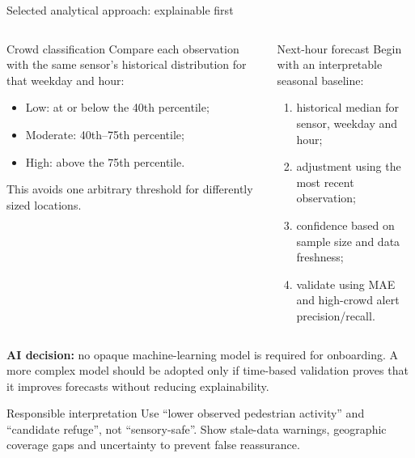 \documentclass[aspectratio=169,11pt]{beamer}
\begin{document}
\begin{frame}{Selected analytical approach: explainable first}
  \small
  \begin{columns}[T,onlytextwidth]
      \begin{block}{Crowd classification}
        Compare each observation with the same sensor's historical distribution
        for that weekday and hour:
        \begin{itemize}
          \item Low: at or below the 40th percentile;
          \item Moderate: 40th--75th percentile;
          \item High: above the 75th percentile.
        \end{itemize}
        This avoids one arbitrary threshold for differently sized locations.
      \end{block}

      \begin{block}{Next-hour forecast}
        Begin with an interpretable seasonal baseline:
        \begin{enumerate}
          \item historical median for sensor, weekday and hour;
          \item adjustment using the most recent observation;
          \item confidence based on sample size and data freshness;
          \item validate using MAE and high-crowd alert precision/recall.
        \end{enumerate}
      \end{block}
  \end{columns}

  \vspace{0.3em}
  \textbf{AI decision:} no opaque machine-learning model is required for
  onboarding. A more complex model should be adopted only if time-based
  validation proves that it improves forecasts without reducing explainability.

  \vspace{0.4em}
  \begin{alertblock}{Responsible interpretation}
    Use ``lower observed pedestrian activity'' and ``candidate refuge'', not
    ``sensory-safe''. Show stale-data warnings, geographic coverage gaps and
    uncertainty to prevent false reassurance.
  \end{alertblock}
\end{frame}
\end{document}
